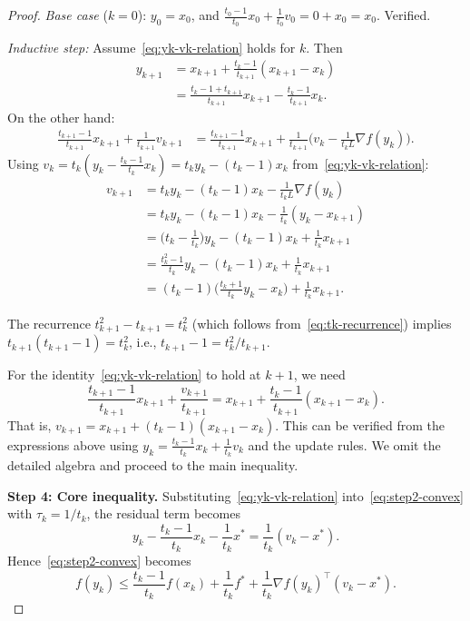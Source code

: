 \documentclass[11pt,a4paper]{article}
\begin{document}
\begin{proof}
\emph{Base case} ($k = 0$): $y_0 = x_0$, and
$\frac{t_0 - 1}{t_0}x_0 + \frac{1}{t_0}v_0 = 0 + x_0 = x_0$.
Verified.

\emph{Inductive step:} Assume~\eqref{eq:yk-vk-relation} holds for $k$.
Then
\begin{align*}
  y_{k+1} &= x_{k+1} + \frac{t_k - 1}{t_{k+1}}(x_{k+1} - x_k) \\
  &= \frac{t_k - 1 + t_{k+1}}{t_{k+1}}x_{k+1}
    - \frac{t_k - 1}{t_{k+1}}x_k.
\end{align*}
On the other hand:
\begin{align*}
  \frac{t_{k+1} - 1}{t_{k+1}}x_{k+1} + \frac{1}{t_{k+1}}v_{k+1}
  &= \frac{t_{k+1} - 1}{t_{k+1}}x_{k+1}
    + \frac{1}{t_{k+1}}\biggl(v_k - \frac{1}{t_k L}\nabla f(y_k)\biggr).
\end{align*}
Using $v_k = t_k(y_k - \frac{t_k-1}{t_k}x_k) = t_k y_k - (t_k-1)x_k$
from~\eqref{eq:yk-vk-relation}:
\begin{align*}
  v_{k+1} &= t_k y_k - (t_k-1)x_k - \frac{1}{t_k L}\nabla f(y_k) \\
  &= t_k y_k - (t_k-1)x_k - \frac{1}{t_k}(y_k - x_{k+1}) \\
  &= \biggl(t_k - \frac{1}{t_k}\biggr)y_k - (t_k-1)x_k
    + \frac{1}{t_k}x_{k+1} \\
  &= \frac{t_k^2 - 1}{t_k}y_k - (t_k-1)x_k + \frac{1}{t_k}x_{k+1} \\
  &= (t_k-1)\biggl(\frac{t_k+1}{t_k}y_k - x_k\biggr)
    + \frac{1}{t_k}x_{k+1}.
\end{align*}

The recurrence $t_{k+1}^2 - t_{k+1} = t_k^2$ (which follows
from~\eqref{eq:tk-recurrence}) implies $t_{k+1}(t_{k+1}-1) = t_k^2$,
i.e., $t_{k+1} - 1 = t_k^2/t_{k+1}$.

For the identity~\eqref{eq:yk-vk-relation} to hold at $k+1$, we need
\begin{equation}\label{eq:induction-target}
  \frac{t_{k+1}-1}{t_{k+1}}x_{k+1} + \frac{v_{k+1}}{t_{k+1}}
  = x_{k+1} + \frac{t_k - 1}{t_{k+1}}(x_{k+1} - x_k).
\end{equation}
That is, $v_{k+1} = x_{k+1} + (t_k - 1)(x_{k+1} - x_k)$. This
can be verified from the expressions above using
$y_k = \frac{t_k-1}{t_k}x_k + \frac{1}{t_k}v_k$ and the update rules.
We omit the detailed algebra and proceed to the main inequality.

\textbf{Step 4: Core inequality.}
Substituting~\eqref{eq:yk-vk-relation} into~\eqref{eq:step2-convex}
with $\tau_k = 1/t_k$, the residual term becomes
\[
  y_k - \frac{t_k-1}{t_k}x_k - \frac{1}{t_k}x^*
  = \frac{1}{t_k}(v_k - x^*).
\]
Hence~\eqref{eq:step2-convex} becomes
\begin{equation}\label{eq:convex-clean}
  f(y_k) \le \frac{t_k - 1}{t_k}f(x_k) + \frac{1}{t_k}f^*
  + \frac{1}{t_k}\nabla f(y_k)^\top(v_k - x^*).
\end{equation}


\end{proof}
\end{document}
